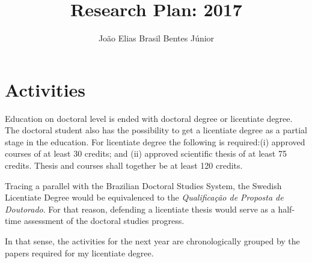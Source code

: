 \documentclass[]{article}
\title{Research Plan: 2017}
\author{Jo\~{a}o Elias Brasil Bentes J\'{u}nior}
\begin{document}
\maketitle

\section*{Activities}

Education on doctoral level is ended with doctoral degree or licentiate degree. The doctoral student also has the possibility to get a licentiate degree as a partial stage in the education. For licentiate degree the following is required:(i) approved courses of at least 30 credits; and (ii) approved scientific thesis of at least 75 credits. Thesis and courses shall together be at least 120 credits.

Tracing a parallel with the Brazilian Doctoral Studies System, the Swedish Licentiate Degree would be equivalenced to the \textit{Qualifica\c{c}\~{a}o de Proposta de Doutorado}. For that reason, defending a licentiate thesis would serve as a half-time assessment of the doctoral studies progress. 

In that sense, the activities for the next year are chronologically grouped by the papers required for my licentiate degree.
\end{document}
